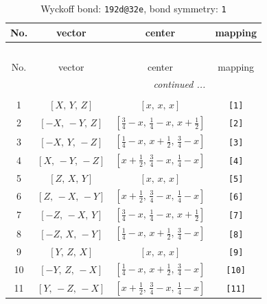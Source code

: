 \documentclass[fleqn,8pt]{jsarticle}
\begin{document}
\begin{longtable}{cccc}
\caption{Wyckoff bond: {\tt 192d@32e}, bond symmetry: {\tt 1}}
 \\
 \hline \hline
No. & vector & center & mapping \\ \hline \endfirsthead

\multicolumn{3}{l}{\tablename\ \thetable{}} \\
 \hline \hline
No. & vector & center & mapping \\ \hline \endhead

 \hline \hline
\multicolumn{3}{r}{\footnotesize\it continued ...} \\ \endfoot

 \hline \hline
\multicolumn{3}{r}{} \\ \endlastfoot

1 & $\left[ X,\, Y,\, Z \right]$ & $\left[ x,\, x,\, x \right]$ & {\tt [1]} \\ \hline
2 & $\left[ - X,\, - Y,\, Z \right]$ & $\left[ \frac{3}{4} - x,\, \frac{1}{4} - x,\, x + \frac{1}{2} \right]$ & {\tt [2]} \\ \hline
3 & $\left[ - X,\, Y,\, - Z \right]$ & $\left[ \frac{1}{4} - x,\, x + \frac{1}{2},\, \frac{3}{4} - x \right]$ & {\tt [3]} \\ \hline
4 & $\left[ X,\, - Y,\, - Z \right]$ & $\left[ x + \frac{1}{2},\, \frac{3}{4} - x,\, \frac{1}{4} - x \right]$ & {\tt [4]} \\ \hline
5 & $\left[ Z,\, X,\, Y \right]$ & $\left[ x,\, x,\, x \right]$ & {\tt [5]} \\ \hline
6 & $\left[ Z,\, - X,\, - Y \right]$ & $\left[ x + \frac{1}{2},\, \frac{3}{4} - x,\, \frac{1}{4} - x \right]$ & {\tt [6]} \\ \hline
7 & $\left[ - Z,\, - X,\, Y \right]$ & $\left[ \frac{3}{4} - x,\, \frac{1}{4} - x,\, x + \frac{1}{2} \right]$ & {\tt [7]} \\ \hline
8 & $\left[ - Z,\, X,\, - Y \right]$ & $\left[ \frac{1}{4} - x,\, x + \frac{1}{2},\, \frac{3}{4} - x \right]$ & {\tt [8]} \\ \hline
9 & $\left[ Y,\, Z,\, X \right]$ & $\left[ x,\, x,\, x \right]$ & {\tt [9]} \\ \hline
10 & $\left[ - Y,\, Z,\, - X \right]$ & $\left[ \frac{1}{4} - x,\, x + \frac{1}{2},\, \frac{3}{4} - x \right]$ & {\tt [10]} \\ \hline
11 & $\left[ Y,\, - Z,\, - X \right]$ & $\left[ x + \frac{1}{2},\, \frac{3}{4} - x,\, \frac{1}{4} - x \right]$ & {\tt [11]} \\ \hline

\end{longtable}
\end{document}
